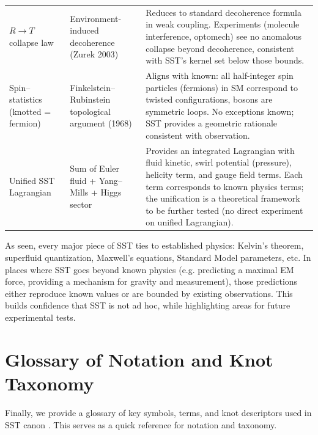 \documentclass[reprint,aps,onecolumn,nofootinbib]{revtex4-2}
\begin{document}
\begin{table}[hbt!]
\begin{ruledtabular}
\begin{tabular}{|p{3.0cm} p{4.0cm} p{8.0cm}|}
				$R\to T$ collapse law & Environment-induced decoherence (Zurek 2003) & Reduces to standard decoherence formula in weak coupling. Experiments (molecule interference, optomech) see no anomalous collapse beyond decoherence, consistent with SST’s kernel set below those bounds. \\
				Spin–statistics (knotted = fermion) & Finkelstein–Rubinstein topological argument (1968) & Aligns with known: all half-integer spin particles (fermions) in SM correspond to twisted configurations, bosons are symmetric loops. No exceptions known; SST provides a geometric rationale consistent with observation. \\
				Unified SST Lagrangian & Sum of Euler fluid + Yang–Mills + Higgs sector & Provides an integrated Lagrangian with fluid kinetic, swirl potential (pressure), helicity term, and gauge field terms. Each term corresponds to known physics terms; the unification is a theoretical framework to be further tested (no direct experiment on unified Lagrangian). \\
			\end{tabular}
		\end{ruledtabular}
	\end{table}

	As seen, every major piece of SST ties to established physics: Kelvin’s theorem, superfluid quantization, Maxwell’s equations, Standard Model parameters, etc. In places where SST goes beyond known physics (e.g. predicting a maximal EM force, providing a mechanism for gravity and measurement), those predictions either reproduce known values or are bounded by existing observations. This builds confidence that SST is not ad hoc, while highlighting areas for future experimental tests.

	\section{Glossary of Notation and Knot Taxonomy}
	Finally, we provide a glossary of key symbols, terms, and knot descriptors used in SST canon \canonversion. This serves as a quick reference for notation and taxonomy.
\end{document}

